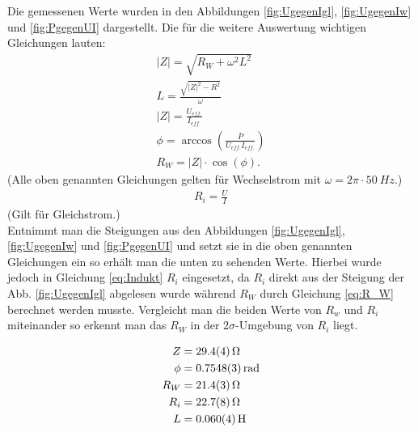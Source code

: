 Die gemessenen Werte wurden in den Abbildungen \ref{fig:UgegenIgl},  \ref{fig:UgegenIw} und \ref{fig:PgegenUI} dargestellt.
Die für die weitere Auswertung wichtigen Gleichungen lauten:
\begin{align}
	|Z|=\sqrt{R_W + \omega^2L^2}\\
	L=\frac{\sqrt{|Z|^2-R^2}}{\omega}\\
	\label{eq:Indukt}
	|Z|=\frac{U_{eff.}}{I_{eff.}}\\
	\phi = \arccos\left(\frac{\bar{P}}{U_{eff.}I_{eff.}}\right)\\
	R_W=|Z|\cdot \cos(\phi)	\label{eq:R_W}.
\end{align}
(Alle oben genannten Gleichungen gelten für Wechselstrom mit $\omega=2\pi \cdot \SI{50}{Hz}.$)
\begin{align}
	R_i=\frac{U}{I}
\end{align}
(Gilt für Gleichstrom.)\\
Entnimmt man die Steigungen aus den Abbildungen \ref{fig:UgegenIgl}, \ref{fig:UgegenIw} und \ref{fig:PgegenUI} und setzt sie in die oben genannten Gleichungen ein so erhält man die unten zu sehenden Werte. Hierbei wurde jedoch in Gleichung \ref{eq:Indukt} $R_i$ eingesetzt, da $R_i$ direkt aus der Steigung der Abb. \ref{fig:UgegenIgl} abgelesen wurde während $R_W$ durch Gleichung \ref{eq:R_W} berechnet werden musste. Vergleicht man die beiden Werte von $R_w$ und $R_i$ miteinander so erkennt man das  $R_W$ in der $2\sigma$-Umgebung von $R_i$ liegt. 

\begin{align}
		Z &= \SI{29.4+-0.4}{\ohm}\\
		\phi &= \SI{0.7548+-0.0003}{rad}\\
		R_W &= \SI{21.4+-0.3}{\ohm}\\
		R_i &= \SI{22.7+-0.8}{\ohm}\\
		L &= \SI{0,060+-0,004}{H}\\
\end{align}
